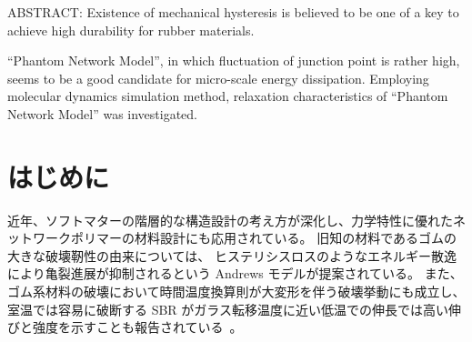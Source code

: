 \documentclass[uplatex,10pt,a4paper,twocolumn]{jsarticle}
\begin{document}


\begin{spacing}{0.95}
ABSTRACT: 
Existence of mechanical hysteresis is believed to be one of a key to achieve high durability for rubber materials.

``Phantom Network Model'', in which fluctuation of junction point is rather high, seems to be a good candidate for micro-scale energy dissipation.
Employing molecular dynamics simulation method, relaxation characteristics of ``Phantom Network Model'' was investigated.
\end{spacing}

\section{はじめに}
近年、ソフトマターの階層的な構造設計の考え方が深化し、力学特性に優れたネットワークポリマーの材料設計にも応用されている。
旧知の材料であるゴムの大きな破壊靭性の由来については、 ヒステリシスロスのようなエネルギー散逸により亀裂進展が抑制されるという Andrews モデルが提案されている\cite{andrews}。
また、ゴム系材料の破壊において時間温度換算則が大変形を伴う破壊挙動にも成立し、室温では容易に破断する SBR がガラス転移温度に近い低温での伸長では高い伸びと強度を示すことも報告されている~\cite{smith}。
\end{document}
